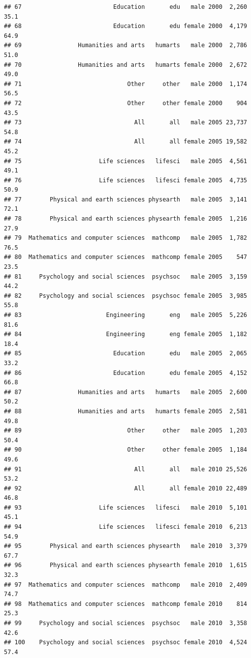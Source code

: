 \documentclass[]{article}
\begin{document}
\begin{verbatim}
## 67                          Education       edu   male 2000  2,260    35.1
## 68                          Education       edu female 2000  4,179    64.9
## 69                Humanities and arts   humarts   male 2000  2,786    51.0
## 70                Humanities and arts   humarts female 2000  2,672    49.0
## 71                              Other     other   male 2000  1,174    56.5
## 72                              Other     other female 2000    904    43.5
## 73                                All       all   male 2005 23,737    54.8
## 74                                All       all female 2005 19,582    45.2
## 75                      Life sciences   lifesci   male 2005  4,561    49.1
## 76                      Life sciences   lifesci female 2005  4,735    50.9
## 77        Physical and earth sciences physearth   male 2005  3,141    72.1
## 78        Physical and earth sciences physearth female 2005  1,216    27.9
## 79  Mathematics and computer sciences  mathcomp   male 2005  1,782    76.5
## 80  Mathematics and computer sciences  mathcomp female 2005    547    23.5
## 81     Psychology and social sciences  psychsoc   male 2005  3,159    44.2
## 82     Psychology and social sciences  psychsoc female 2005  3,985    55.8
## 83                        Engineering       eng   male 2005  5,226    81.6
## 84                        Engineering       eng female 2005  1,182    18.4
## 85                          Education       edu   male 2005  2,065    33.2
## 86                          Education       edu female 2005  4,152    66.8
## 87                Humanities and arts   humarts   male 2005  2,600    50.2
## 88                Humanities and arts   humarts female 2005  2,581    49.8
## 89                              Other     other   male 2005  1,203    50.4
## 90                              Other     other female 2005  1,184    49.6
## 91                                All       all   male 2010 25,526    53.2
## 92                                All       all female 2010 22,489    46.8
## 93                      Life sciences   lifesci   male 2010  5,101    45.1
## 94                      Life sciences   lifesci female 2010  6,213    54.9
## 95        Physical and earth sciences physearth   male 2010  3,379    67.7
## 96        Physical and earth sciences physearth female 2010  1,615    32.3
## 97  Mathematics and computer sciences  mathcomp   male 2010  2,409    74.7
## 98  Mathematics and computer sciences  mathcomp female 2010    814    25.3
## 99     Psychology and social sciences  psychsoc   male 2010  3,358    42.6
## 100    Psychology and social sciences  psychsoc female 2010  4,524    57.4

\end{verbatim}
\end{document}
